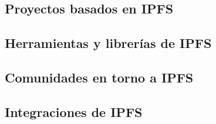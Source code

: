 \subsection{Proyectos basados en IPFS} %
\subsection{Herramientas y librerías de IPFS}
\subsection{Comunidades en torno a IPFS}
\subsection{Integraciones de IPFS}
